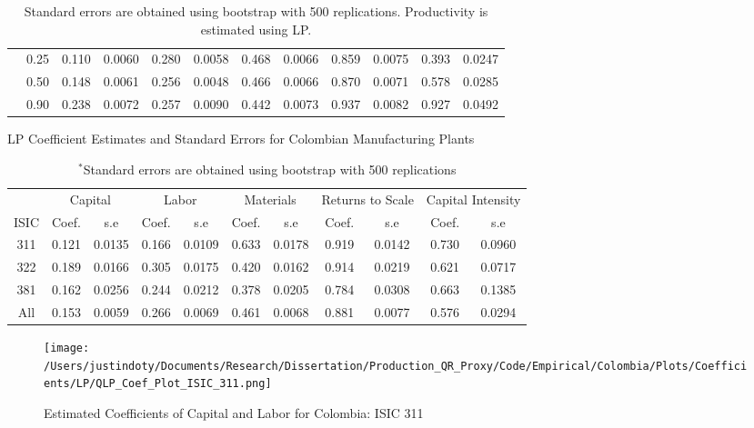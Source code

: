 \documentclass[11pt]{article}
\begin{document}
\begin{table}[H]
\begin{tabular}{cccccccccccc}
   & 0.25 & 0.110 & 0.0060 & 0.280 & 0.0058 & 0.468 & 0.0066 & 0.859 & 0.0075 & 0.393 & 0.0247 \\ 
   & 0.50 & 0.148 & 0.0061 & 0.256 & 0.0048 & 0.466 & 0.0066 & 0.870 & 0.0071 & 0.578 & 0.0285 \\ 
   & 0.90 & 0.238 & 0.0072 & 0.257 & 0.0090 & 0.442 & 0.0073 & 0.937 & 0.0082 & 0.927 & 0.0492 \\ 
   \hline
\end{tabular}
\caption*{\footnotesize Standard errors are obtained using bootstrap with 500 replications. Productivity is estimated using LP.}
\label{COLestLP}
\end{table}

\begin{table}[H]
\centering
\caption{LP Coefficient Estimates and Standard Errors for Colombian Manufacturing Plants}
\begin{tabular}{ccccccccccc}
  \hline\hline & \multicolumn{2}{c}{Capital} & \multicolumn{2}{c}{Labor} & \multicolumn{2}{c}{Materials} & \multicolumn{2}{c}{Returns to Scale} & \multicolumn{2}{c}{Capital Intensity}\\ \cmidrule(lr){2-3} \cmidrule(lr){4-5} \cmidrule(lr){6-7} \cmidrule(lr){8-9} \cmidrule(lr){10-11}ISIC & Coef. & s.e & Coef. & s.e & Coef. & s.e & Coef. & s.e & Coef. & s.e \\ 
  \hline
311 & 0.121 & 0.0135 & 0.166 & 0.0109 & 0.633 & 0.0178 & 0.919 & 0.0142 & 0.730 & 0.0960 \\ 
  322 & 0.189 & 0.0166 & 0.305 & 0.0175 & 0.420 & 0.0162 & 0.914 & 0.0219 & 0.621 & 0.0717 \\ 
  381 & 0.162 & 0.0256 & 0.244 & 0.0212 & 0.378 & 0.0205 & 0.784 & 0.0308 & 0.663 & 0.1385 \\ 
  All & 0.153 & 0.0059 & 0.266 & 0.0069 & 0.461 & 0.0068 & 0.881 & 0.0077 & 0.576 & 0.0294 \\ 
   \hline
\end{tabular}
\caption*{\footnotesize $^{*}$Standard errors are obtained using bootstrap with 500 replications}
\label{COLLPcoef}
\end{table}

\begin{figure}[H]
\centering
\caption{Estimated Coefficients of Capital and Labor for Colombia: ISIC 311}
\texttt{[image: /Users/justindoty/Documents/Research/Dissertation/Production\_QR\_Proxy/Code/Empirical/Colombia/Plots/Coefficients/LP/QLP\_Coef\_Plot\_ISIC\_311.png]}
\label{fig:LPCOL311}
\end{figure}
\end{document}
